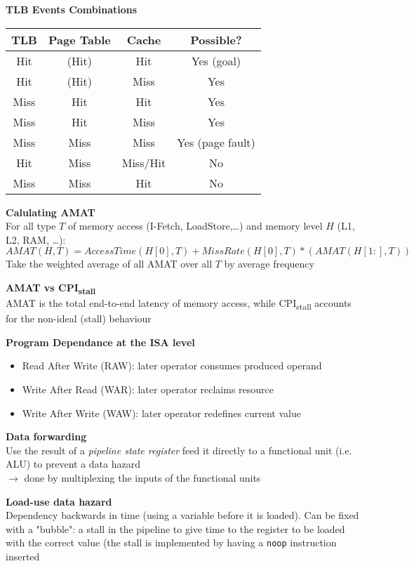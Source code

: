 \documentclass[10pt,letterpaper,landscape]{report}
\newcommand{\boxheight}{21.59cm}
\newcommand{\boxwidth}{8.85cm}
\begin{document}
\begin{small}
{\begin{minipage}[t][\boxheight][c]{\boxwidth}
	\textbf{TLB Events Combinations}\\
	\begin{tabular}{|c|c|c|c|}
		\hline 
		TLB & Page Table & Cache & Possible? \\ 
		\hline 
		\hline 
		Hit & (Hit) & Hit & Yes (goal) \\ 
		\hline 
		Hit & (Hit) & Miss & Yes \\ 
		\hline 
		Miss & Hit & Hit & Yes \\ 
		\hline 
		Miss & Hit & Miss & Yes \\ 
		\hline 
		Miss & Miss & Miss & Yes (page fault) \\ 
		\hline 
		Hit & Miss & Miss/Hit & No \\ 
		\hline 
		Miss & Miss & Hit & No \\ 
		\hline 
	\end{tabular} 
	
	\textbf{Calulating AMAT}\\
	For all type $T$ of memory access (I-Fetch, LoadStore,\dots) and memory level $H$ (L1, L2, RAM, \dots):\\
	$AMAT(H, T) = AccessTime(H[0], T) + MissRate(H[0], T) * (AMAT(H[1:], T))$\\
	Take the weighted average of all AMAT over all $T$ by average frequency
	
	\textbf{AMAT vs CPI\textsubscript{stall}}\\
	AMAT is the total end-to-end latency of memory access, while CPI\textsubscript{stall} accounts for the non-ideal (stall) behaviour

	\textbf{Program Dependance at the ISA level}
	\begin{itemize}
		\item Read After Write (RAW): later operator consumes produced operand
		\item Write After Read (WAR): later operator reclaims resource
		\item Write After Write (WAW): later operator redefines current value
	\end{itemize}
	
	\textbf{Data forwarding}\\
	Use the result of a \textit{pipeline state register} feed it directly to a functional unit (i.e. ALU) to prevent a data hazard\\
	$\rightarrow$ done by multiplexing the inputs of the functional units
	
    \textbf{Load-use data hazard}\\
    Dependency backwards in time (using a variable before it is loaded). Can be fixed with a "bubble": a stall in the pipeline to give time to the register to be loaded with the correct value (the stall is implemented by having a \texttt{noop} instruction inserted
    

\end{minipage}}
\end{small}
\end{document}
